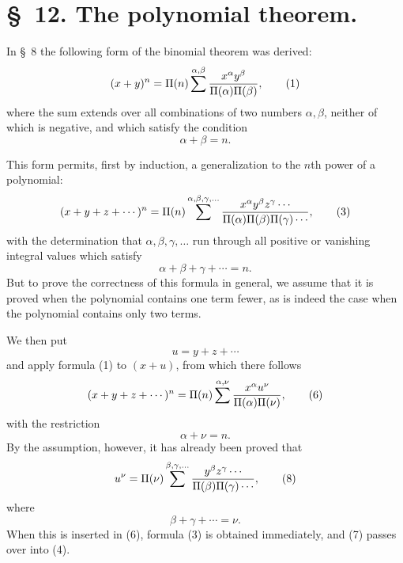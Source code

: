 \documentclass[11pt]{article}
\begin{document}
\section*{\S~12. The polynomial theorem.}

In \S~8 the following form of the binomial theorem was derived:
\begin{equation}
 (x+y)^n=\Pi(n)\sum^{\alpha,\beta}{x^\alpha y^\beta\over \Pi(\alpha)\Pi(\beta)},
\tag{1}
\end{equation}
where the sum extends over all combinations of two numbers $\alpha,\beta$, neither of which is negative, and which satisfy the condition
\begin{equation}
 \alpha+\beta=n.
\tag{2}
\end{equation}

This form permits, first by induction, a generalization to the $n$th power of a polynomial:
\begin{equation}
 (x+y+z+\cdots)^n=\Pi(n)\sum^{\alpha,\beta,\gamma,\ldots}
 {x^\alpha y^\beta z^\gamma\cdots
\over \Pi(\alpha)\Pi(\beta)\Pi(\gamma)\cdots},
\tag{3}
\end{equation}
with the determination that $\alpha,\beta,\gamma,\ldots$ run through all positive or vanishing integral values which satisfy
\begin{equation}
 \alpha+\beta+\gamma+\cdots=n.
\tag{4}
\end{equation}
But to prove the correctness of this formula in general, we assume that it is proved when the polynomial contains one term fewer, as is indeed the case when the polynomial contains only two terms.

We then put
\begin{equation}
 u=y+z+\cdots
\tag{5}
\end{equation}
and apply formula (1) to $(x+u)$, from which there follows
\begin{equation}
 (x+y+z+\cdots)^n=\Pi(n)\sum^{\alpha,\nu}{x^\alpha u^\nu
\over \Pi(\alpha)\Pi(\nu)},
\tag{6}
\end{equation}
with the restriction
\begin{equation}
 \alpha+\nu=n.
\tag{7}
\end{equation}
By the assumption, however, it has already been proved that
\begin{equation}
 u^\nu=\Pi(\nu)\sum^{\beta,\gamma,\ldots}
 {y^\beta z^\gamma\cdots
\over \Pi(\beta)\Pi(\gamma)\cdots},
\tag{8}
\end{equation}
where
\begin{equation}
 \beta+\gamma+\cdots=\nu.
\tag{9}
\end{equation}
When this is inserted in (6), formula (3) is obtained immediately, and (7) passes over into (4).
\end{document}
